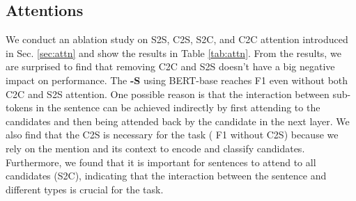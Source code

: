\documentclass[11pt]{article}
\begin{document}
\subsection{Attentions}
We conduct an ablation study on S2S, C2S, S2C, and C2C attention introduced in Sec. \ref{sec:attn} and show the results in Table \ref{tab:attn}. From the results, we are surprised to find that removing C2C and S2S doesn't have a big negative impact on performance. The {\bf \textsc{\name-S}} using BERT-base reaches  F1 even without both C2C and S2S attention. One possible reason is that the interaction between sub-tokens in the sentence can be achieved indirectly by first attending to the candidates and then being attended back by the candidate in the next layer. We also find that the C2S is necessary for the task ( F1 without C2S) because we rely on the mention and its context to encode and classify candidates. Furthermore, we found that it is important for sentences to attend to all candidates (S2C), indicating that the interaction between the sentence and different types is crucial for the task.

\begin{table}[t]
\centering
{}
\caption{Attention analysis.}
\label{tab:attn}
\end{table}
\end{document}
